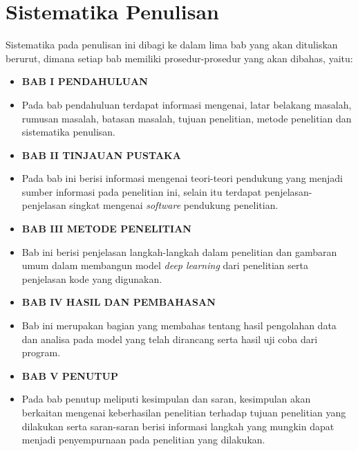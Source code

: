 \section{Sistematika Penulisan}
Sistematika pada penulisan ini dibagi ke dalam lima bab yang akan dituliskan berurut, dimana setiap bab memiliki prosedur-prosedur yang akan dibahas, yaitu:

\begin{itemize}[label={\phantom{•}}]
    \item \textbf{BAB I PENDAHULUAN}
    \item[] Pada bab pendahuluan terdapat informasi mengenai, latar belakang masalah, rumusan masalah, batasan masalah, tujuan penelitian, metode penelitian dan sistematika penulisan.
    \item \textbf{BAB II TINJAUAN PUSTAKA}
    \item[] Pada bab ini berisi informasi mengenai teori-teori pendukung yang menjadi sumber informasi pada penelitian ini, selain itu terdapat penjelasan-penjelasan singkat mengenai \textit{software} pendukung penelitian.
    \item \textbf{BAB III METODE PENELITIAN}
    \item[] Bab ini berisi penjelasan langkah-langkah dalam penelitian dan gambaran umum dalam membangun model \textit{deep learning} dari penelitian serta penjelasan kode yang digunakan.
    \item \textbf{BAB IV HASIL DAN PEMBAHASAN}
    \item[] Bab ini merupakan bagian yang membahas tentang hasil pengolahan data dan analisa pada model yang telah dirancang serta hasil uji coba dari program.
    \item \textbf{BAB V PENUTUP}
    \item[] Pada bab penutup meliputi kesimpulan dan saran, kesimpulan akan berkaitan mengenai keberhasilan penelitian terhadap tujuan penelitian yang dilakukan serta saran-saran berisi informasi langkah yang mungkin dapat menjadi penyempurnaan pada penelitian yang dilakukan.
\end{itemize}
